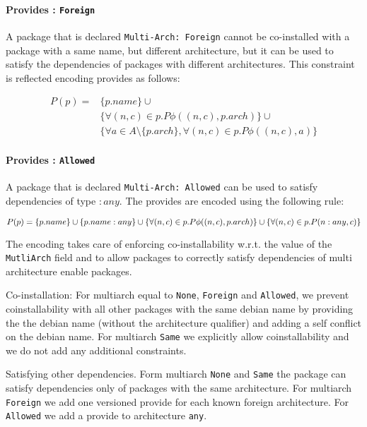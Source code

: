 \paragraph{Provides : \texttt{Foreign}}

A package that is declared \texttt{Multi-Arch: Foreign} cannot be
co-installed with a package with a same name, but different
architecture, but it can be used to satisfy the dependencies of
packages with different architectures. This constraint is reflected 
encoding provides as follows:

\[
  \begin{array}{rl}
    P(p) = & \{ p.name \} \cup \\
           & \{ \forall (n,c) \in p.P \phi((n,c), p.arch) \} \cup \\
           & \{ \forall a \in A \setminus \{ p.arch \}, \forall (n,c) \in p.P \phi(( n,c),a) \}
   \end{array}
\]


\paragraph{Provides : \texttt{Allowed}}
A package that is declared \texttt{Multi-Arch: Allowed} can be used to 
satisfy dependencies of type $:any$. The provides are encoded using
the following rule:

\[
  P(p) = \{ p.name \} \cup \{ p.name:any \} \cup \\
  \{ \forall (n,c) \in p.P \phi(( n,c), p.arch) \} \cup \\
  \{ \forall (n,c) \in p.P ( n:any,c) \} 
\]

The encoding takes care of enforcing co-installability w.r.t. the value of the
\texttt{MutliArch} field and to allow packages to correctly satisfy
dependencies of multi architecture enable packages.


\par{Co-installation}: For multiarch equal to \texttt{None}, \texttt{Foreign}
and \texttt{Allowed}, we prevent coinstallability with all other packages with
the same debian name by providing the the debian name (without the architecture
qualifier) and adding a self conflict on the debian name. For multiarch
\texttt{Same} we explicitly allow coinstallability and we do not add any
additional constraints.

\par{Satisfying other dependencies}. Form multiarch \texttt{None} and
\texttt{Same} the package can satisfy dependencies only of packages with the
same architecture. For multiarch \texttt{Foreign} we add one versioned provide
for each known foreign architecture. For \texttt{Allowed} we add a provide to
architecture \texttt{any}.

